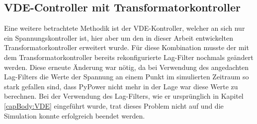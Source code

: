 \subsection{VDE-Controller mit Transformatorkontroller}
\label{chap_VDE_t}
Eine weitere betrachtete Methodik ist der VDE-Kontroller, welcher an sich nur ein Spannungskontroller ist, hier aber um den in dieser Arbeit entwickelten Transformatorkontroller erweitert wurde. Für diese Kombination musste der mit dem Transformatorkontroller bereits rekonfigurierte Lag-Filter nochmals geändert werden. Diese erneute Änderung war nötig, da bei Verwendung des angedachten Lag-Filters  die Werte der Spannung an einem Punkt im simulierten Zeitraum so stark gefallen sind, dass PyPower nicht mehr in der Lage war diese Werte zu berechnen. Bei der Verwendung des Lag-Filters, wie er ursprünglich in Kapitel \ref{capBody:VDE} eingeführt wurde, trat dieses Problem nicht auf und die Simulation konnte erfolgreich beendet werden. 
